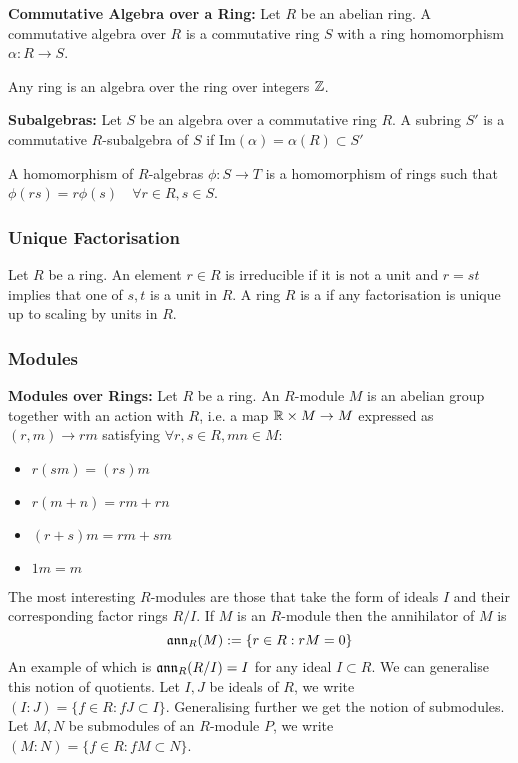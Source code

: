 \begin{definition}
    \textbf{Commutative Algebra over a Ring: }Let $R$ be an abelian ring. A commutative algebra over $R$ is a commutative ring $S$ with a ring homomorphism $\alpha: R\to S$.
\end{definition}

\begin{proposition}
    Any ring is an algebra over the ring over integers $\mathbb{Z}$. 
\end{proposition}

\begin{definition}
    \textbf{Subalgebras: }Let $S$ be an algebra over a commutative ring $R$. A subring $S'$ is a commutative $R$-subalgebra of $S$ if $\text{Im}(\alpha) = \alpha(R) \subset S'$
\end{definition}

A homomorphism of $R$-algebras $\phi : S\to T$ is a homomorphism of rings such that $\phi(rs) = r\phi(s) \quad \forall r\in R, s\in S$. 

\subsubsection{Unique Factorisation}
Let $R$ be a ring. An element $r\in R$ is irreducible if it is not a unit and $r = st$ implies that one of $s,t$ is a unit in $R$. A ring $R$ is a \ufd  if any factorisation is unique up to scaling by units in $R$. 

\subsubsection{Modules}
\begin{definition}
    \textbf{Modules over Rings: }Let $R$ be a ring. An $R$-module $M$ is an abelian group together with an action with $R$, i.e. a map $\mathbb{R}\times M\to M$ expressed as $(r,m)\to rm$ satisfying $\forall r,s\in R, mn\in M$:
    \begin{itemize}
        \item $r(sm) = (rs)m$ 
        \item $r(m + n) = rm + rn$ 
        \item $(r + s)m = rm + sm$
        \item $1m = m$
    \end{itemize}
\end{definition}
The most interesting $R$-modules are those that take the form of ideals $I$ and their corresponding factor rings $R/I$. If $M$ is an $R$-module then the annihilator of $M$ is 
\[\mathfrak{a}\mathfrak{n}\mathfrak{n}_R(M) := \{r\in R: rM = 0\}\]
An example of which is $\mathfrak{a}\mathfrak{n}\mathfrak{n}_R(R/I) = I$ for any ideal $I\subset R$. We can generalise this notion of quotients. Let $I,J$ be ideals of $R$, we write $(I:J) = \{f \in R: fJ\subset I\}$. Generalising further we get the notion of submodules. Let $M, N$ be submodules of an $R$-module $P$, we write $(M:N) = \{f\in R: fM \subset N\}$. 

